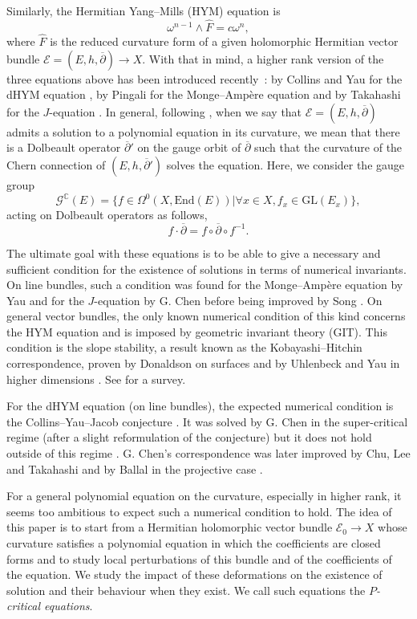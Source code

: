 \documentclass{article}
\theoremstyle{remark}
\theoremstyle{definition}
\newcommand{\C}{\mathbb{C}}
\newcommand{\End}{\mathrm{End}}
\newcommand{\GL}{\mathrm{GL}}
\newcommand{\E}{\mathcal{E}}
\newcommand{\G}{\mathcal{G}}
\newcommand{\dbar}{\overline{\partial}}
\begin{document}
Similarly, the Hermitian Yang--Mills (HYM) equation is
$$
\omega^{n - 1} \wedge \hat{F} = c\omega^n,
$$
where $\hat{F}$ is the reduced curvature form of a given holomorphic Hermitian vector bundle $\E = (E,h,\dbar) \rightarrow X$. With that in mind, a higher rank version of the three equations above has been introduced recently~: by Collins and Yau for the dHYM equation \cite[Paragraph 8.1]{Collins_Yau_2018}, by Pingali for the Monge--Ampère equation \cite{Pingali} and by Takahashi for the $J$-equation \cite{Takahashi}. In general, following \cite{DNST}, when we say that $\E = (E,h,\dbar)$ admits a solution to a polynomial equation in its curvature, we mean that there is a Dolbeault operator $\dbar'$ on the gauge orbit of $\dbar$ such that the curvature of the Chern connection of $(E,h,\dbar')$ solves the equation. Here, we consider the gauge group
$$
\G^\C(E) = \{f \in \Omega^0(X,\End(E))|\forall x \in X, f_x \in \GL(E_x)\},
$$
acting on Dolbeault operators as follows,
$$
f \cdot \dbar = f \circ \dbar \circ f^{-1}.
$$

The ultimate goal with these equations is to be able to give a necessary and sufficient condition for the existence of solutions in terms of numerical invariants. On line bundles, such a condition was found for the Monge--Ampère equation by Yau \cite{Yau} and for the $J$-equation by G. Chen \cite[Theorem 1.1]{Chen} before being improved by Song \cite{Song}. On general vector bundles, the only known numerical condition of this kind concerns the HYM equation and is imposed by geometric invariant theory (GIT). This condition is the slope stability, a result known as the Kobayashi--Hitchin correspondence, proven by Donaldson on surfaces \cite{Donaldson} and by Uhlenbeck and Yau in higher dimensions \cite{Uhlenbeck_Yau}. See \cite{Lübke_Teleman} for a survey.

For the dHYM equation (on line bundles), the expected numerical condition is the Collins--Yau--Jacob conjecture \cite{Collins_Yau_Jacob}. It was solved by G. Chen in the super-critical regime \cite[Theorem 1.7]{Chen} (after a slight reformulation of the conjecture) but it does not hold outside of this regime \cite[Remark 1.10]{Chen}. G. Chen's correspondence was later improved by Chu, Lee and Takahashi \cite[Theorem 1.2]{CLT} and by Ballal in the projective case \cite[Corollary 1]{Ballal}.

For a general polynomial equation on the curvature, especially in higher rank, it seems too ambitious to expect such a numerical condition to hold. The idea of this paper is to start from a Hermitian holomorphic vector bundle $\E_0 \rightarrow X$ whose curvature satisfies a polynomial equation in which the coefficients are closed forms and to study local perturbations of this bundle and of the coefficients of the equation. We study the impact of these deformations on the existence of solution and their behaviour when they exist. We call such equations the \textit{$P$-critical equations}.
\end{document}
